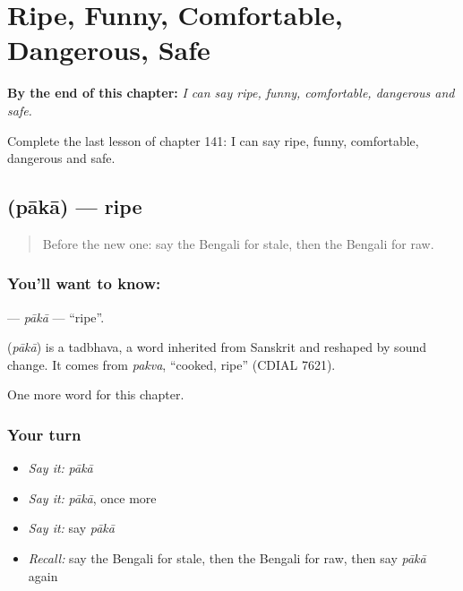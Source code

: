 
\chapter{Ripe, Funny, Comfortable, Dangerous, Safe}
\label{ch:bn-ripe-funny-comfortable-dangerous-safe}

\begin{chapteropening}
\textbf{By the end of this chapter:} \emph{I can say ripe, funny, comfortable, dangerous and safe.}

Complete the last lesson of chapter 141: I can say ripe, funny, comfortable, dangerous and safe.
\end{chapteropening}

\section[\texorpdfstring{\bn{পাকা} (pākā)}{পাকা (pākā)}]{ (pākā) — ripe}

\label{lesson:BN-C141-paka}



\begin{quote}
Before the new one: say the Bengali for stale, then the Bengali for raw.
\end{quote}

\subsection*{You'll want to know: }
\textbf{} — \emph{pākā} — \textquotedblleft{}ripe\textquotedblright{}.

\begin{cousinweb}
\textbf{} (\emph{pākā}) is a tadbhava, a word inherited from Sanskrit and reshaped by sound change. It comes from \emph{pakva}, \textquotedblleft{}cooked, ripe\textquotedblright{} (CDIAL 7621).
\end{cousinweb}

\begin{grammarlens}[title={What you've built}]
One more word for this chapter.
\end{grammarlens}

\subsection*{Your turn}
\begin{itemize}
\raggedright
  \item \emph{Say it:} \emph{pākā}
  \item \emph{Say it:} \emph{pākā}, once more
  \item \emph{Say it:} say \emph{pākā}
  \item \emph{Recall:} say the Bengali for stale, then the Bengali for raw, then say \emph{pākā} again
\end{itemize}

